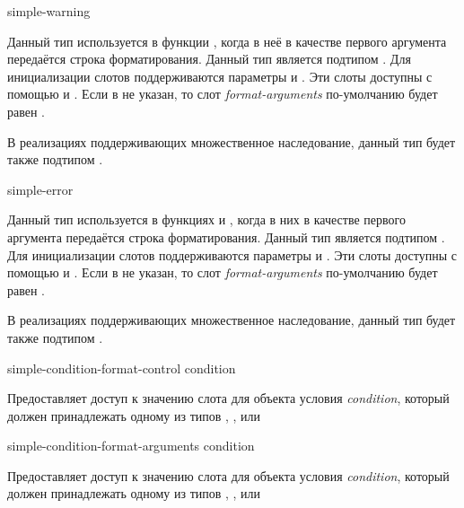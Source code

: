 \begin{defun}[Тип]
simple-warning

Данный тип используется в функции , когда в неё в качестве первого
аргумента передаётся строка форматирования. Данный тип является подтипом
. Для инициализации слотов поддерживаются 
параметры  и . Эти слоты доступны с
помощью  и
. Если в 
 не указан, то слот \emph{format-arguments} по-умолчанию
будет равен .

В реализациях поддерживающих множественное наследование, данный тип будет также
подтипом .
\end{defun}

\begin{defun}[Тип]
simple-error

Данный тип используется в функциях  и , когда в них в
качестве первого аргумента передаётся строка форматирования. Данный тип является
подтипом . Для инициализации слотов поддерживаются параметры
 и . Эти слоты доступны с помощью
 и
. Если в 
 не указан, то слот \emph{format-arguments} по-умолчанию
будет равен .

В реализациях поддерживающих множественное наследование, данный тип будет также
подтипом .
\end{defun}

\begin{defun}[Функция]
simple-condition-format-control condition

Предоставляет доступ к значению слота  для объекта условия
\emph{condition}, который должен принадлежать одному из типов
, ,  или
\end{defun}

\begin{defun}[Функция]
simple-condition-format-arguments condition

Предоставляет доступ к значению слота  для объекта условия
\emph{condition}, который должен принадлежать одному из типов
, ,  или
\end{defun}

